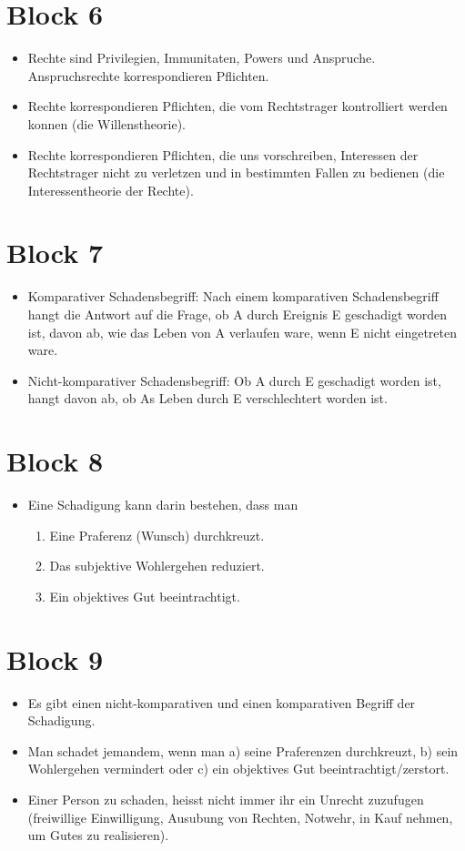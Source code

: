 \documentclass[../main.tex]{subfiles}
\begin{document}
\section{Block 6}
\begin{itemize}
	\item Rechte sind Privilegien, Immunitaten, Powers und Anspruche.
Anspruchsrechte korrespondieren Pflichten. 
	\item Rechte korrespondieren Pflichten, die vom Rechtstrager kontrolliert werden konnen (die Willenstheorie). 
	\item Rechte korrespondieren Pflichten, die uns vorschreiben,  Interessen der Rechtstrager nicht zu verletzen und in bestimmten Fallen zu bedienen (die Interessentheorie der Rechte).  
\end{itemize}

\section{Block 7}
\begin{itemize}
	\item Komparativer Schadensbegriff: Nach einem komparativen Schadensbegriff hangt die Antwort auf die Frage, ob A durch Ereignis E geschadigt worden ist, davon ab, wie das Leben von A verlaufen ware, wenn E nicht eingetreten ware.  
	\item Nicht-komparativer Schadensbegriff: Ob A durch E geschadigt worden ist, hangt davon ab, ob As Leben durch E verschlechtert worden ist. 
\end{itemize}

\section{Block 8}
\begin{itemize}
	\item Eine Schadigung kann darin bestehen, dass man\begin{enumerate}[label=(\alph*)]	\item Eine Praferenz (Wunsch) durchkreuzt.
			\item Das subjektive Wohlergehen reduziert.
			\item Ein objektives Gut beeintrachtigt.
		\end{enumerate}
\end{itemize}

\section{Block 9}
\begin{itemize}
	\item Es gibt einen nicht-komparativen und einen komparativen Begriff der Schadigung. 
	\item Man schadet jemandem, wenn man a) seine Praferenzen durchkreuzt, b) sein Wohlergehen vermindert oder c) ein objektives Gut beeintrachtigt/zerstort. 
	\item Einer Person zu schaden, heisst nicht immer ihr ein Unrecht zuzufugen (freiwillige Einwilligung, Ausubung von Rechten, Notwehr, in Kauf nehmen, um Gutes zu realisieren).   
\end{itemize}
\end{document}
